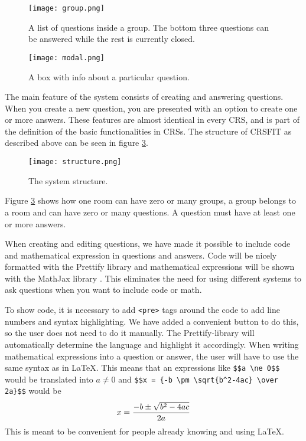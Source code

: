 \begin{figure}[H]
\capstart
	\centering
		\texttt{[image: group.png]}
	\caption[Inside a group]{A list of questions inside a group. The bottom three questions can be answered while the rest is currently closed.}\label{fig:group}
\end{figure}

\begin{figure}[H]
\capstart
	\centering
		\texttt{[image: modal.png]}
	\caption[Info box]{A box with info about a particular question.}\label{fig:modal}
\end{figure}

The main feature of the system consists of creating and answering questions. When you create a new question, you are presented with an option to create one or more answers.
These features are almost identical in every CRS, and is part of the definition of the basic functionalities in CRSs. 
The structure of CRSFIT as described above can be seen in figure \ref{fig:structure}.

\begin{figure}[H]
\capstart
	\centering
		\texttt{[image: structure.png]}
	\caption[System Structure]{The system structure.}\label{fig:structure}
\end{figure}

Figure \ref{fig:structure} shows how one room can have zero or many groups, a group belongs to a room and can have zero or many questions. A question must have at least one or more answers.

When creating and editing questions, we have made it possible to include code and mathematical expression in questions and answers. Code will be nicely formatted with the Prettify library \cite{google/code-prettify_2016} and mathematical expressions will be shown with the MathJax library \cite{mathjax_2016}. This eliminates the need for using different systems to ask questions when you want to include code or math. 

To show code, it is necessary to add \texttt{<pre>} tags around the code to add line numbers and syntax highlighting. We have added a convenient button to do this, so the user does not need to do it manually. The Prettify-library will automatically determine the language and highlight it accordingly. When writing mathematical expressions into a question or answer, the user will have to use the same syntax as in \LaTeX. This means that an expressions like \verb|$$a \ne 0$$| would be translated into $a \ne 0$ and \verb|$$x = {-b \pm \sqrt{b^2-4ac} \over 2a}$$| would be 
$$x = {-b \pm \sqrt{b^2-4ac} \over 2a}$$
This is meant to be convenient for people already knowing and using \LaTeX.

